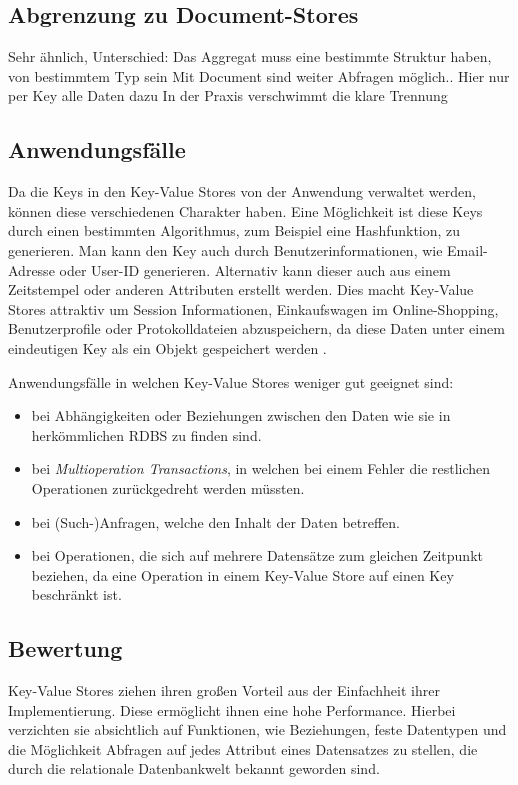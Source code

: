 \subsection{Abgrenzung zu Document-Stores}
Sehr ähnlich, Unterschied: Das Aggregat muss eine bestimmte Struktur haben, von bestimmtem Typ sein
Mit Document sind weiter Abfragen möglich.. Hier nur per Key alle Daten dazu
In der Praxis verschwimmt die klare Trennung

\subsection{Anwendungsfälle}
Da die Keys in den Key-Value Stores von der Anwendung verwaltet werden, können diese verschiedenen Charakter haben. Eine Möglichkeit ist diese Keys durch einen bestimmten Algorithmus, zum Beispiel eine Hashfunktion, zu generieren. Man kann den Key auch durch Benutzerinformationen, wie Email-Adresse oder User-ID generieren. Alternativ kann dieser auch aus einem Zeitstempel oder anderen Attributen erstellt werden. Dies macht Key-Value Stores attraktiv um Session Informationen, Einkaufswagen im Online-Shopping, Benutzerprofile oder Protokolldateien abzuspeichern, da diese Daten unter einem eindeutigen Key als ein Objekt gespeichert werden \cite{sadalage01}. 

Anwendungsfälle in welchen Key-Value Stores weniger gut geeignet sind:
\begin{itemize}
\item bei Abhängigkeiten oder Beziehungen zwischen den Daten wie sie in herkömmlichen RDBS zu finden sind.
\item bei \textit{Multioperation Transactions}, in welchen bei einem Fehler die restlichen Operationen zurückgedreht werden müssten.
\item bei (Such-)Anfragen, welche den Inhalt der Daten betreffen.
\item bei Operationen, die sich auf mehrere Datensätze zum gleichen Zeitpunkt beziehen, da eine Operation in einem Key-Value Store auf einen Key beschränkt ist.
\end{itemize}

\subsection{Bewertung}
Key-Value Stores ziehen ihren großen Vorteil aus der Einfachheit ihrer Implementierung. Diese ermöglicht ihnen eine hohe Performance. Hierbei verzichten sie absichtlich auf Funktionen, wie Beziehungen, feste Datentypen und die Möglichkeit Abfragen auf jedes Attribut eines Datensatzes zu stellen, die durch die relationale Datenbankwelt bekannt geworden sind. 